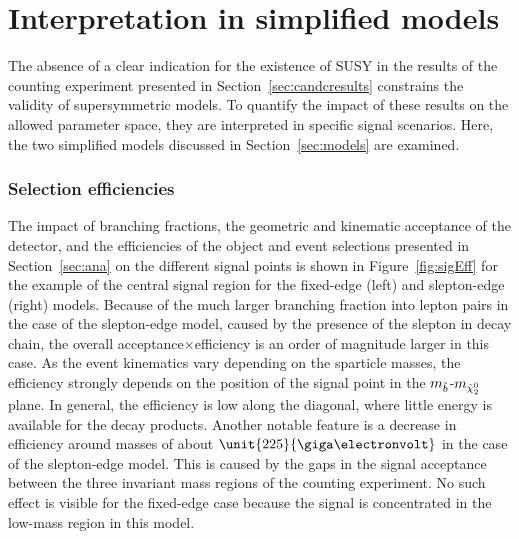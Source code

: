 \section{Interpretation in simplified models}
The absence of a clear indication for the existence of SUSY in the results of the counting experiment presented in Section~\ref{sec:candcresults} constrains the validity of supersymmetric models. To quantify the impact of these results on the allowed parameter space, they are interpreted in specific signal scenarios. Here, the two simplified models discussed in Section~\ref{sec:models} are examined. 

\subsubsection{Selection efficiencies}
The impact of branching fractions, the geometric and kinematic acceptance of the detector, and the efficiencies of the object and event selections presented in Section~\ref{sec:ana} on the different signal points is shown in Figure~\ref{fig:sigEff} for the example of the central signal region for the fixed-edge (left) and slepton-edge (right) models. Because of the much larger branching fraction into lepton pairs in the case of the slepton-edge model, caused by the presence of the slepton in decay chain, the overall acceptance$\times$efficiency is an order of magnitude larger in this case. As the event kinematics vary depending on the sparticle masses, the efficiency strongly depends on the position of the signal point in the $m_{\tilde{b}}$-$m_{{\tilde{\chi}^0_2}}$ plane. In general, the efficiency is low along the diagonal, where little energy is available for the decay products. Another notable feature is a decrease in efficiency around \secondchi masses of about $\unit{225}{\giga\electronvolt}$ in the case of the slepton-edge model. This is caused by the gaps in the signal acceptance between the three invariant mass regions of the counting experiment. No such effect is visible for the fixed-edge case because the signal is concentrated in the low-mass region in this model.  

